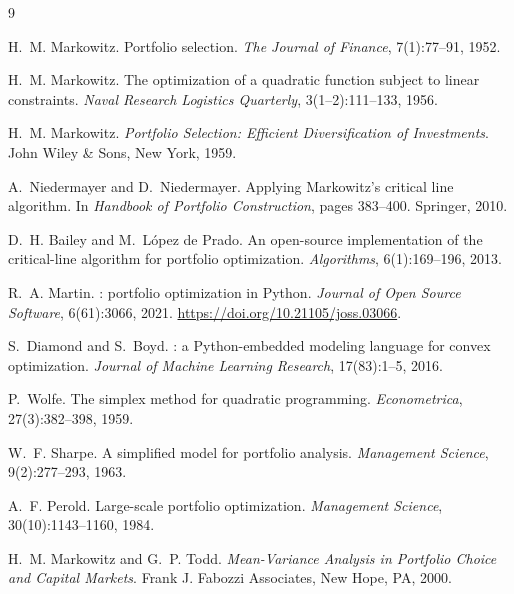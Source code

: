 \documentclass[11pt]{article}
\begin{document}
\begin{thebibliography}{9}

H.~M. Markowitz.
\newblock Portfolio selection.
\newblock \emph{The Journal of Finance}, 7(1):77--91, 1952.

H.~M. Markowitz.
\newblock The optimization of a quadratic function subject to linear constraints.
\newblock \emph{Naval Research Logistics Quarterly}, 3(1--2):111--133, 1956.

H.~M. Markowitz.
\newblock \emph{Portfolio Selection: Efficient Diversification of Investments}.
\newblock John Wiley \& Sons, New York, 1959.

A.~Niedermayer and D.~Niedermayer.
\newblock Applying Markowitz's critical line algorithm.
\newblock In \emph{Handbook of Portfolio Construction}, pages 383--400. Springer, 2010.

D.~H. Bailey and M.~L\'opez de Prado.
\newblock An open-source implementation of the critical-line algorithm for portfolio
optimization.
\newblock \emph{Algorithms}, 6(1):169--196, 2013.

R.~A. Martin.
: portfolio optimization in {Python}.
\newblock \emph{Journal of Open Source Software}, 6(61):3066, 2021.
\newblock \url{https://doi.org/10.21105/joss.03066}.

S.~Diamond and S.~Boyd.
: a {Python}-embedded modeling language for convex optimization.
\newblock \emph{Journal of Machine Learning Research}, 17(83):1--5, 2016.

P.~Wolfe.
\newblock The simplex method for quadratic programming.
\newblock \emph{Econometrica}, 27(3):382--398, 1959.

W.~F. Sharpe.
\newblock A simplified model for portfolio analysis.
\newblock \emph{Management Science}, 9(2):277--293, 1963.

A.~F. Perold.
\newblock Large-scale portfolio optimization.
\newblock \emph{Management Science}, 30(10):1143--1160, 1984.

H.~M. Markowitz and G.~P. Todd.
\newblock \emph{Mean-Variance Analysis in Portfolio Choice and Capital Markets}.
\newblock Frank J. Fabozzi Associates, New Hope, PA, 2000.


\end{thebibliography}
\end{document}
